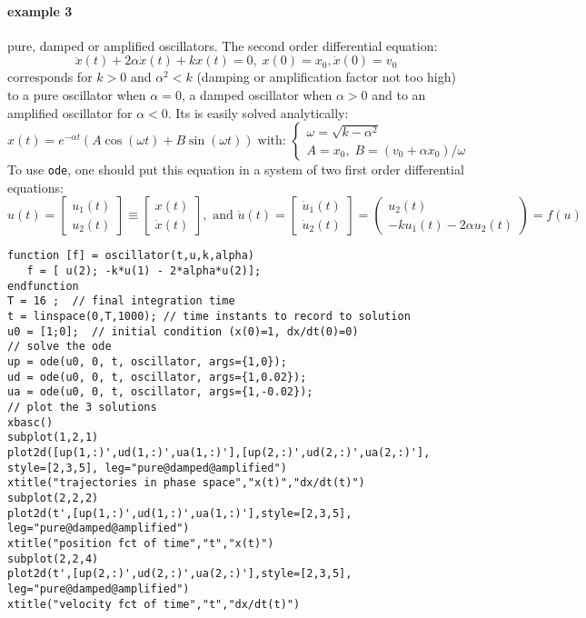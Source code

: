 \begin{examples}
\paragraph{example 3} pure, damped or amplified oscillators. The second order differential
equation:
$$
  \ddot{x}(t) + 2 \alpha \dot{x}(t) + k x(t) = 0, \; x(0)=x_0, \dot{x}(0) = v_0 
$$ 
corresponds for $k > 0$ and $\alpha^2 < k$ (damping or amplification factor not too high) to 
a pure oscillator when $\alpha=0$, a damped oscillator when $\alpha>0$ and to an amplified 
oscillator for $\alpha<0$. Its is easily solved analytically:
$$
  x(t) = e^{-\alpha t}( A \cos(\omega t) + B \sin(\omega t) ) \; \mbox{with: }
\left\{ \begin{array}{l}
\omega = \sqrt{k - \alpha^2} \\
A = x_0, \; B = (v_0 + \alpha x_0)/\omega
\end{array} \right.
$$
To use {\tt ode}, one should put this equation in a system of two first order differential 
equations:
$$
u(t) =  \left[ \begin{array}{c} u_1(t) \\  u_2(t)\end{array} \right]  \equiv  \left[ \begin{array}{c} x(t) \\
    \dot{x}(t)\end{array} \right], \mbox{ and }
\dot{u}(t) =  \left[ \begin{array}{c} \dot{u}_1(t) \\ \dot{u}_2(t) \end{array} \right] =
    \left( \begin{array}{c} u_2(t) \\  -k u_1(t) - 2 \alpha u_2(t) \end{array} \right) = f(u)
$$
\begin{Verbatim}
function [f] = oscillator(t,u,k,alpha)
   f = [ u(2); -k*u(1) - 2*alpha*u(2)];
endfunction
T = 16 ;  // final integration time
t = linspace(0,T,1000); // time instants to record to solution
u0 = [1;0];  // initial condition (x(0)=1, dx/dt(0)=0)
// solve the ode
up = ode(u0, 0, t, oscillator, args={1,0});
ud = ode(u0, 0, t, oscillator, args={1,0.02});
ua = ode(u0, 0, t, oscillator, args={1,-0.02});
// plot the 3 solutions
xbasc()
subplot(1,2,1)
plot2d([up(1,:)',ud(1,:)',ua(1,:)'],[up(2,:)',ud(2,:)',ua(2,:)'], style=[2,3,5], leg="pure@damped@amplified")
xtitle("trajectories in phase space","x(t)","dx/dt(t)")
subplot(2,2,2)
plot2d(t',[up(1,:)',ud(1,:)',ua(1,:)'],style=[2,3,5], leg="pure@damped@amplified")
xtitle("position fct of time","t","x(t)")
subplot(2,2,4)
plot2d(t',[up(2,:)',ud(2,:)',ua(2,:)'],style=[2,3,5], leg="pure@damped@amplified")
xtitle("velocity fct of time","t","dx/dt(t)")
\end{Verbatim}
 

\end{examples}
